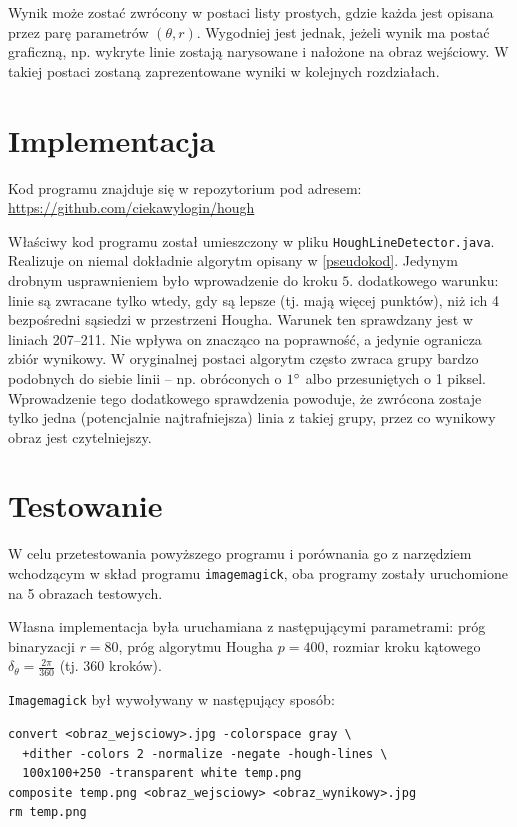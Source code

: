 \documentclass[10pt]{article} %
\begin{document}
Wynik może zostać zwrócony w postaci listy prostych, gdzie każda jest opisana przez parę parametrów $(\theta, r)$. Wygodniej jest jednak, jeżeli wynik ma postać graficzną, np. wykryte linie zostają narysowane i nałożone na obraz wejściowy. W takiej postaci zostaną zaprezentowane wyniki w kolejnych rozdziałach.

\section{Implementacja}

Kod programu znajduje się w repozytorium pod adresem: \\
\href{https://github.com/ciekawylogin/hough}{https://github.com/ciekawylogin/hough}

Właściwy kod programu został umieszczony w pliku \texttt{HoughLineDetector.java}. Realizuje on niemal dokładnie algorytm opisany w \ref{pseudokod}. Jedynym drobnym usprawnieniem było wprowadzenie do kroku $5.$ dodatkowego warunku: linie są zwracane tylko wtedy, gdy są lepsze (tj. mają więcej punktów), niż ich 4 bezpośredni sąsiedzi w przestrzeni Hougha. Warunek ten sprawdzany jest w liniach 207--211. Nie wpływa on znacząco na poprawność, a jedynie ogranicza zbiór wynikowy. W oryginalnej postaci algorytm często zwraca grupy bardzo podobnych do siebie linii -- np. obróconych o $1\degree$ albo przesuniętych o 1 piksel. Wprowadzenie tego dodatkowego sprawdzenia powoduje, że zwrócona zostaje tylko jedna (potencjalnie najtrafniejsza) linia z takiej grupy, przez co wynikowy obraz jest czytelniejszy.

\section{Testowanie}

W celu przetestowania powyższego programu i porównania go z narzędziem wchodzącym w skład programu \texttt{imagemagick}, oba programy zostały uruchomione na 5 obrazach testowych.

Własna implementacja była uruchamiana z następującymi parametrami: próg binaryzacji $r=80$, próg algorytmu Hougha $p=400$, rozmiar kroku kątowego $\delta_\theta = \frac{2\pi}{360}$ (tj. 360 kroków).

\texttt{Imagemagick} był wywoływany w następujący sposób:

\begin{lstlisting}
convert <obraz_wejsciowy>.jpg -colorspace gray \
  +dither -colors 2 -normalize -negate -hough-lines \
  100x100+250 -transparent white temp.png 
composite temp.png <obraz_wejsciowy> <obraz_wynikowy>.jpg
rm temp.png
\end{lstlisting}
\end{document}
